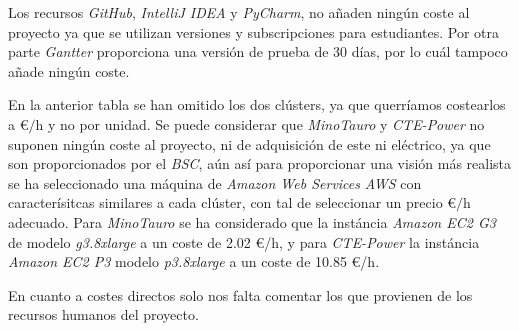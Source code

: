 Los recursos \textit{GitHub}, \textit{IntelliJ IDEA} y \textit{PyCharm}, no añaden ningún coste al proyecto ya que se utilizan versiones y subscripciones para estudiantes. Por otra parte \textit{Gantter} proporciona una versión de prueba de 30 días, por lo cuál tampoco añade ningún coste.
\par\bigskip

En la anterior tabla se han omitido los dos clústers, ya que querríamos costearlos a \euro$/$h y no por unidad. Se puede considerar que \textit{MinoTauro} y \textit{CTE-Power} no suponen ningún coste al proyecto, ni de adquisición de este ni eléctrico, ya que son proporcionados por el \textit{BSC}, aún así para proporcionar una visión más realista se ha seleccionado una máquina de \textit{Amazon Web Services} \textit{AWS} con caracterísitcas similares a cada clúster, con tal de seleccionar un precio \euro$/$h adecuado. Para \textit{MinoTauro} se ha considerado que la instáncia \textit{Amazon EC2 G3} de modelo \textit{g3.8xlarge} a un coste de 2.02 \euro/h, y para \textit{CTE-Power} la instáncia \textit{Amazon EC2 P3} modelo \textit{p3.8xlarge} a un coste de 10.85 \euro/h.
\par\bigskip

En cuanto a costes directos solo nos falta comentar los que provienen de los recursos humanos del proyecto.

\begin{comment}
begin{table}[ht!]
 \centering
 \begin{tabular}{c|c|c|c|} 
  \cline{2-4}
                & Horas (h) & Precio/Hora(\euro) & Total(\euro) \\
  \cline{2-4}\hline
  Desarrollador & 489 & 10 & 4890 \\
  \hline
  Director & 55 & 30 & 1650\\
  \hline 
  Codirector & 50 & 30 & 1500\\
  \hline
  Soporte & 20 & 20 & 400\\
  \hline
  \rowcolor{gray!50}
  Total & - & - & 8440\\
  \hline
 \end{tabular}
\caption{Costes directos provenientes de recursos humanos.}
\end{table}
\end{comment}

